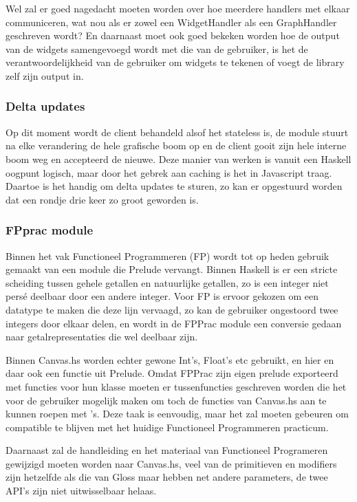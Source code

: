 Wel zal er goed nagedacht moeten worden over hoe meerdere handlers met elkaar communiceren, wat nou als er zowel een WidgetHandler als een GraphHandler geschreven wordt? En daarnaast moet ook goed bekeken worden hoe de output van de widgets samengevoegd wordt met die van de gebruiker, is het de verantwoordelijkheid van de gebruiker om widgets te tekenen of voegt de library zelf zijn output in.

\subsubsection{Delta updates} \label{subsub:deltas}
Op dit moment wordt de client behandeld alsof het stateless is, de module stuurt na elke verandering de hele grafische boom op en de client gooit zijn hele interne boom weg en accepteerd de nieuwe. Deze manier van werken is vanuit een Haskell oogpunt logisch, maar door het gebrek aan caching is het in Javascript traag. Daartoe is het handig om delta updates te sturen, zo kan er opgestuurd worden dat een rondje drie keer zo groot geworden is.

\subsubsection{FPprac module}
Binnen het vak Functioneel Programmeren (FP) wordt tot op heden gebruik gemaakt van een module die Prelude vervangt. Binnen Haskell is er een stricte scheiding tussen gehele getallen en natuurlijke getallen, zo is een integer niet persé deelbaar door een andere integer. Voor FP is ervoor gekozen om een  datatype te maken die deze lijn vervaagd, zo kan de gebruiker ongestoord twee integers door elkaar delen, en wordt in de FPPrac module een conversie gedaan naar getalrepresentaties die wel deelbaar zijn.

Binnen Canvas.hs worden echter gewone Int's, Float's etc gebruikt, en hier en daar ook een functie uit Prelude. Omdat FPPrac zijn eigen prelude exporteerd met functies voor hun  klasse moeten er tussenfuncties geschreven worden die het voor de gebruiker mogelijk maken om toch de functies van Canvas.hs aan te kunnen roepen met 's. Deze taak is eenvoudig, maar het zal moeten gebeuren om compatible te blijven met het huidige Functioneel Programmeren practicum.

Daarnaast zal de handleiding en het materiaal van Functioneel Programeren gewijzigd moeten worden naar Canvas.hs, veel van de primitieven en modifiers zijn hetzelfde als die van Gloss maar hebben net andere parameters, de twee API's zijn niet uitwisselbaar helaas.
